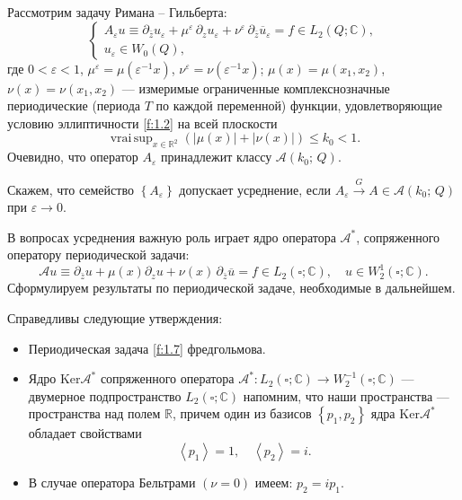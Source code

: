 Рассмотрим задачу Римана -- Гильберта:
\begin{equation}\label{f:1.6}
   \left\{\begin{array}{l}
A_\varepsilon u\equiv\partial_{\bar{z}}u_\varepsilon+\mu^{\varepsilon}\,\partial_z u_\varepsilon
+\nu^\varepsilon\,\partial_{\bar z}\overline u_\varepsilon=f\in L_2(Q;\mathbb{C}), \\[3mm]
   u_\varepsilon\in W_0(Q),
\end{array}\right.
\end{equation}
где $0<\varepsilon<1$, $\mu^\varepsilon=\mu(\varepsilon^{-1}x)$,
$\nu^\varepsilon=\nu(\varepsilon^{-1}x)$; $\mu(x)=\mu(x_1,x_2)$,  $\nu(x)=\nu(x_1,x_2)$ --- измеримые ограниченные комплекснозначные периодические (периода $T$ по каждой переменной)
функции, удовлетворяющие условию эллиптичности \eqref{f:1.2} на всей плоскости
\begin{equation*}
   \mathop{\mathrm {vrai\,sup}}_{x\in \mathbb{R}^2}\left(|\mu(x)|+|\nu(x)|\right)\leqslant k_0 <1.
\end{equation*}
Очевидно, что оператор $A_\varepsilon$ принадлежит классу $\mathscr{A}(k_0;\,Q)$.
\begin{definition}
Скажем, что семейство $\left\{ A_\varepsilon \right\}$ допускает усреднение, если $A_\varepsilon \overset{G}{\longrightarrow}A\in \mathscr{A}(k_0;\,Q) $ при
$\varepsilon\to 0$.
\end{definition}

В вопросах усреднения важную роль играет ядро оператора $\mathscr{A}^*$, сопряженного оператору периодической задачи:
\begin{equation}\label{f:1.7}
 \mathscr{A}u\equiv \partial_{\bar{z}}u +\mu(x) \partial_{z}u +\nu(x)\,
 \partial_{\bar z}\overline u=f\in L_2(\square;\mathbb{C}),\quad
 u\in W_2^1(\square;\mathbb{C}).
\end{equation}
Сформулируем результаты по периодической задаче, необходимые в дальнейшем.
\begin{theorem}\label{T_1}
Справедливы следующие утверждения:
\begin{itemize}
\item Периодическая задача \eqref{f:1.7} фредгольмова.
\item Ядро $\mathrm{Ker}\mathscr{A}^{\ast}$ сопряженного
оператора  $\mathscr{A}^\ast:L_2(\square;\mathbb{C})\to
W_2^{-1}(\square;\mathbb{C})$   --- двумерное подпространство
 $L_2(\square;\mathbb{C})$ напомним, что
наши пространства --- пространства над полем $\mathbb{R}$,
причем один из базисов $\left\{p_1,p_2\right\}$ ядра
$\mathrm{Ker}\mathscr{A}^\ast$ обладает свойствами
\begin{equation*}%
\left< p_1\right>=1,\quad \left< p_2\right>=i.
\end{equation*}
\item
В случае оператора Бельтрами $(\nu=0)$ имеем: $p_2=ip_1$.
\end{itemize}
\end{theorem}


